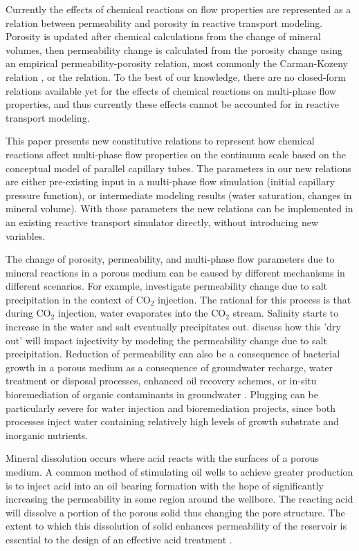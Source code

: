 \documentclass[preprint,12pt,authoryear]{elsarticle}
\begin{document}
Currently the effects of chemical reactions on flow properties are represented as a relation between permeability and porosity in reactive transport modeling. Porosity is updated after chemical calculations from the change of mineral volumes, then permeability change is calculated from the porosity change using an empirical permeability-porosity relation, most commonly the Carman-Kozeny relation \citep{kozeny1927kapillare,carman1956flow}, or the \citet{verma1988thermohydrological} relation. To the best of our knowledge, there are no closed-form relations available yet for the effects of chemical reactions on multi-phase flow properties, and thus currently these effects cannot be accounted for in reactive transport modeling.

This paper presents new constitutive relations to represent how chemical reactions affect multi-phase flow properties on the continuum scale based on the conceptual model of parallel capillary tubes. The parameters in our new relations are either pre-existing input in a multi-phase flow simulation (initial capillary pressure function), or intermediate modeling results (water saturation, changes in mineral volume). With those parameters the new relations can be implemented in an existing reactive transport simulator directly, without introducing new variables. 

The change of porosity, permeability, and multi-phase flow parameters due to mineral reactions in a porous medium can be caused by different mechanisms in different scenarios. For example, \cite{pruess2009formation} investigate permeability change due to salt precipitation in the context of CO$_2$ injection. The rational for this process is that during CO$_2$ injection, water evaporates into the CO$_2$ stream. Salinity starts to increase in the water and salt eventually precipitates out. \cite{pruess2009formation} discuss how this 'dry out' will impact injectivity by modeling the permeability change due to salt precipitation. Reduction of permeability can also be a consequence of bacterial growth in a porous medium as a consequence of groundwater recharge, water treatment or disposal processes, enhanced oil recovery schemes, or in-situ bioremediation of organic contaminants in groundwater \citep{taylor1990biofilm,ginn2002processes,schafer1998simulation}. Plugging can be particularly severe for water injection and bioremediation projects, since both processes inject water containing relatively high levels of growth substrate and inorganic nutrients. 

Mineral dissolution occurs where acid reacts with the surfaces of a porous medium. A common method of stimulating oil wells to achieve greater production is to inject acid into an oil bearing formation with the hope of significantly increasing the permeability in some region around the wellbore. The reacting acid will dissolve a portion of the porous solid thus changing the pore structure. The extent to which this dissolution of solid enhances  permeability of the reservoir is essential to the design of an effective acid treatment \citep{schechter1969change, hiorth2010impact}. 
\end{document}
